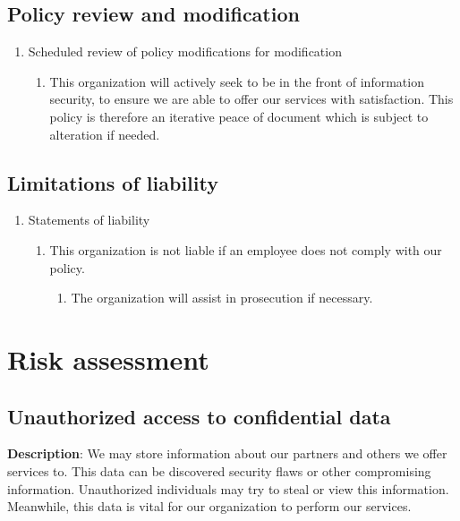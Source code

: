 \subsection{Policy review and modification}

\begin{enumerate}
  \item Scheduled review of policy modifications for modification
  \begin{enumerate}
    \item This organization will actively seek to be in the front of information security, to ensure we are able to offer our services with satisfaction. This policy is therefore an iterative peace of document which is subject to alteration if needed.
  \end{enumerate}
\end{enumerate}

\subsection{Limitations of liability}

\begin{enumerate}
  \item Statements of liability
  \begin{enumerate}
    \item This organization is not liable if an employee does not comply with our policy.
    \begin{enumerate}
      \item The organization will assist in prosecution if necessary.
    \end{enumerate}
  \end{enumerate}
\end{enumerate}


\section{Risk assessment}

\subsection{Unauthorized access to confidential data}

\textbf{Description}: We may store information about our partners and others we offer services to. This data can be discovered security flaws or other compromising information. Unauthorized individuals may try to steal or view this information. Meanwhile, this data is vital for our organization to perform our services. 

